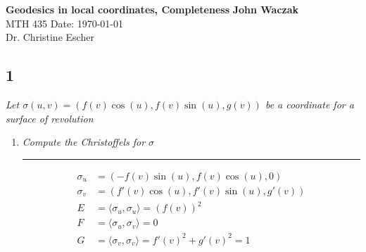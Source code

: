 \documentclass[a4paper, 11pt]{article}
\begin{document}
\noindent
\large\textbf{Geodesics in local coordinates, Completeness} \hfill \textbf{John Waczak} \\
\normalsize MTH 435 \hfill  Date: \today \\
Dr. Christine Escher \\



\subsection*{1}
	\textit{Let $\sigma(u,v)=(f(v)\cos(u), f(v)\sin(u), g(v))$ be a coordinate for a surface of revolution}
	
	\begin{enumerate}[label=\alph*]
		\item \textit{Compute the Christoffels for $\sigma$}
		\par\noindent\rule{\textwidth}{0.4pt}
		\begin{align*}
			\sigma_u &= (-f(v)\sin(u), f(v)\cos(u), 0) \\ 
			\sigma_v &= (f'(v)\cos(u), f'(v)\sin(u), g'(v)) \\ 
			E &= \langle \sigma_u, \sigma_u \rangle = (f(v))^2 \\
			F &= \langle \sigma_u, \sigma_v \rangle = 0 \\ 
			G &= \langle \sigma_v, \sigma_v \rangle = f'(v)^2+g'(v)^2 =1 
		\end{align*}
		

\end{enumerate}
\end{document}

